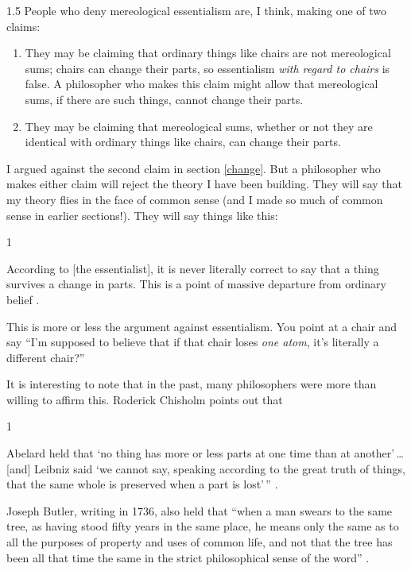 \documentclass[11pt]{article}
\newenvironment{squote}{%
\begin{spacing}{1}
\begin{list}{}{%
\setlength{\labelwidth}{0pt}%
\rightmargin\leftmargin%
}
\item\relax
}{%
\end{list}%
\end{spacing}
}
\begin{document}
\begin{spacing}{1.5}
People who deny mereological essentialism are, I think, making one of
two claims:

\begin{enumerate}
  \item They may be claiming that ordinary things like chairs are not
    mereological sums; chairs can change their parts, so essentialism
    {\em with regard to chairs} is false.  A philosopher who makes
    this claim might allow that mereological sums, if there are such
    things, cannot change their parts.
  \item They may be claiming that mereological sums, whether or not
    they are identical with ordinary things like chairs, can change
    their parts.
\end{enumerate}

I argued against the second claim in section \ref{change}.  But a
philosopher who makes either claim will reject the theory I have been
building.  They will say that my theory flies in the face of common
sense (and I made so much of common sense in earlier sections!).  They
will say things like this:

\begin{squote}
According to [the essentialist], it is never literally correct to say
that a thing survives a change in parts.  This is a point of massive
departure from ordinary belief \citep[184]{sider2001}.
\end{squote}

This is more or less the argument against essentialism.  You point at
a chair and say ``I'm supposed to believe that if that chair loses
{\em one atom}, it's literally a different chair?''

It is interesting to note that in the past, many philosophers were
more than willing to affirm this.  Roderick Chisholm points out that

\begin{squote}
Abelard held that `no thing has more or less parts at one time than at
another'\,\ldots [and] Leibniz said `we cannot say, speaking according
to the great truth of things, that the same whole is preserved when a
part is lost'\,'' \citeyearpar[145]{chisholm1979}.
\end{squote}

Joseph Butler, writing in 1736, also held that ``when a man swears to
the same tree, as having stood fifty years in the same place, he means
only the same as to all the purposes of property and uses of common
life, and not that the tree has been all that time the same in the
strict philosophical sense of the word''
\citeyearpar[100]{butler1975a}.


\end{spacing}
\end{document}
